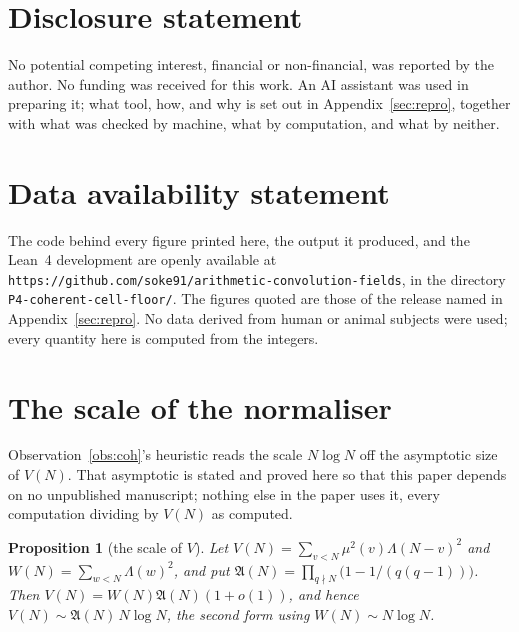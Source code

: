 \documentclass[11pt,a4paper]{article}
\theoremstyle{plain}
\newtheorem{proposition}[theorem]{Proposition}
\theoremstyle{definition}
\theoremstyle{remark}
\newcommand{\AAA}{\mathfrak{A}}
\begin{document}
\section*{Disclosure statement}

No potential competing interest, financial or non-financial, was
reported by the author. No funding was received for this work. An AI
assistant was used in preparing it; what tool, how, and why is set out
in Appendix~\ref{sec:repro}, together with what was checked by machine,
what by computation, and what by neither.

\section*{Data availability statement}

The code behind every figure printed here, the output it produced, and
the Lean~4 development are openly available at
\texttt{https://github.com/soke91/arithmetic-convolution-fields}, in
the directory \texttt{P4-coherent-cell-floor/}. The figures quoted are
those of the release named in Appendix~\ref{sec:repro}. No data derived
from human or animal subjects were used; every quantity here is
computed from the integers.

\appendix
\section{The scale of the normaliser}\label{sec:scale}

Observation~\ref{obs:coh}'s heuristic reads the scale $N\log N$ off the
asymptotic size of $V(N)$. That asymptotic is stated and proved here so
that this paper depends on no unpublished manuscript; nothing else in
the paper uses it, every computation dividing by $V(N)$ as computed.

\begin{proposition}[the scale of $V$]\label{prop:V}
Let $V(N)=\sum_{v<N}\mu^2(v)\Lambda(N-v)^2$ and
$W(N)=\sum_{w<N}\Lambda(w)^2$, and put
$\AAA(N)=\prod_{q\nmid N}\bigl(1-1/(q(q-1))\bigr)$. Then
$V(N)=W(N)\AAA(N)(1+o(1))$, and hence $V(N)\sim\AAA(N)\,N\log N$, the
second form using $W(N)\sim N\log N$.
\end{proposition}
\end{document}
